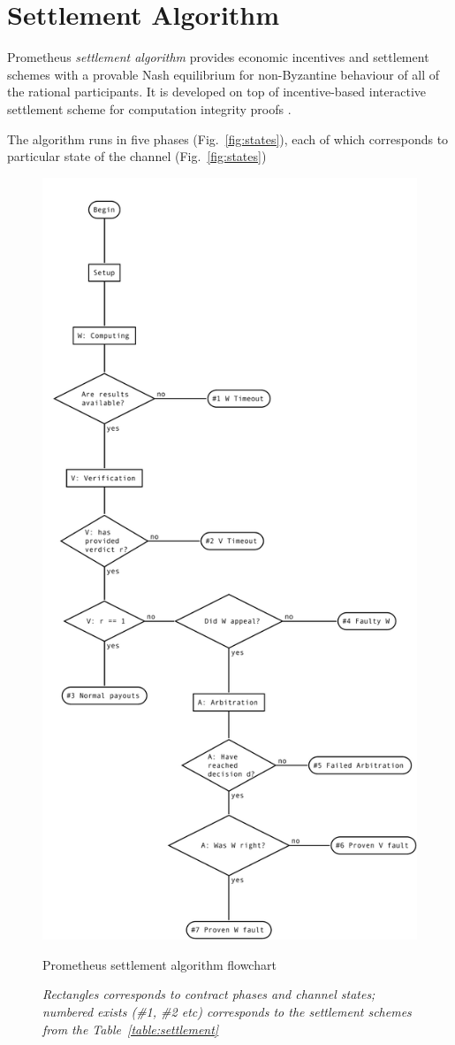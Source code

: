 \documentclass[a4paper]{article}
\begin{document}
\section{Settlement Algorithm}
\label{settlement}

Prometheus \textit{settlement algorithm} provides economic incentives and settlement schemes with a provable Nash equilibrium for non-Byzantine behaviour of all of the rational participants. It is developed on top of incentive-based interactive settlement scheme for computation integrity proofs \cite{ibiss}.

The algorithm runs in five phases (Fig.~\ref{fig:states}), each of which corresponds to particular state of the channel (Fig.~\ref{fig:states})

\begin{figure}[hp]
    \centering
    \includegraphics[height=1.5\columnwidth]{assets/settlementflow.pdf}
    \caption{Prometheus settlement algorithm flowchart}
    \caption*{\textit{Rectangles corresponds to contract phases and channel states; numbered exists (\#1, \#2 etc) corresponds to the settlement schemes from the Table~\ref{table:settlement}}}
    \label{fig:settlementflow}
\end{figure}
\end{document}
